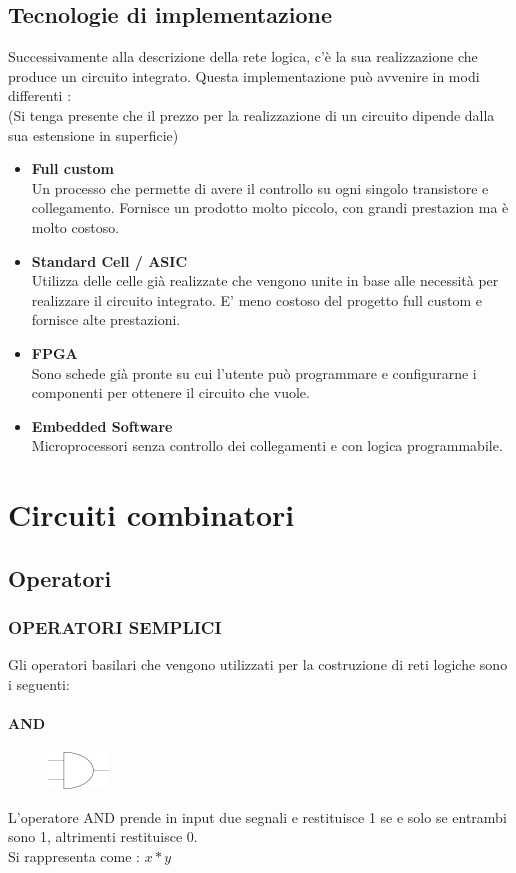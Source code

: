 \documentclass[a4paper]{book}
\begin{document}
\newpage
\section*{Tecnologie di implementazione}

Successivamente alla descrizione della rete logica, c'è la sua realizzazione che produce un circuito integrato. 
Questa implementazione può avvenire in modi differenti :
\\(Si tenga presente che il prezzo per la realizzazione di un circuito dipende dalla sua estensione in superficie)

\begin{itemize}
\item
	\textbf{Full custom}\\
Un processo che permette di avere il controllo su ogni singolo transistore e collegamento. Fornisce un prodotto molto piccolo, con grandi prestazion ma è molto costoso. 
\item
	\textbf{Standard Cell / ASIC}\\
Utilizza delle celle già realizzate che vengono unite in base alle necessità per realizzare il circuito integrato.
E' meno costoso del progetto full custom e fornisce alte prestazioni.
\item
	\textbf{FPGA}\\
Sono schede già pronte su cui l'utente può programmare e configurarne i componenti per ottenere il circuito che vuole.
\item
	\textbf{Embedded Software}\\
Microprocessori senza controllo dei collegamenti e con logica programmabile.
\end{itemize}

\chapter{Circuiti combinatori}
\section{Operatori}
\subsection{OPERATORI SEMPLICI}
Gli operatori basilari che vengono utilizzati per la costruzione di reti logiche sono i seguenti:\\
\subsubsection*{AND}
\begin{figure}
\includegraphics{AndPrecisa}
\end{figure}
L'operatore AND prende in input  due segnali e restituisce 1 se e solo se entrambi sono 1, altrimenti restituisce 0.
\\ Si rappresenta come : \(x*y\)\\
\end{document}
